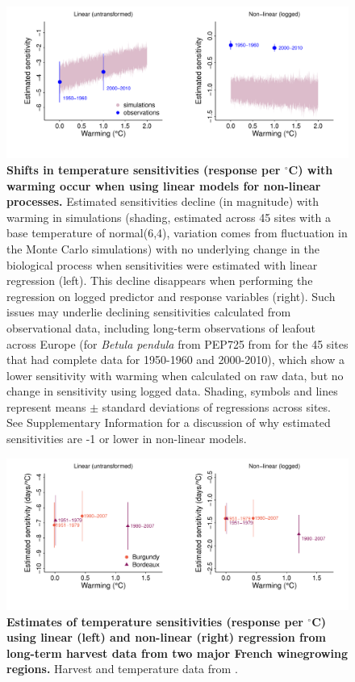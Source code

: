 \documentclass[11pt,letter]{article}
\begin{document}
\begin{figure}[h!]
\centering
\noindent \includegraphics[width=1.05\textwidth]{..//analyses/figures/basicsimsandpepalt1.pdf} %
\caption{\textbf{Shifts in temperature sensitivities (response per $^{\circ}$C)  with warming occur when using linear models for non-linear processes.} Estimated sensitivities decline (in magnitude) with warming in simulations (shading, estimated across 45 sites with a base temperature of normal(6,4), variation comes from fluctuation in the Monte Carlo simulations) with no underlying change in the biological process when sensitivities were estimated with linear regression (left). This decline disappears when performing the regression on logged predictor and response variables (right). Such issues may underlie declining sensitivities calculated from observational data, including long-term observations of leafout across Europe (for \emph{Betula pendula} from PEP725 from for the 45 sites that had complete data for 1950-1960 and 2000-2010), which show a lower sensitivity with warming when calculated on raw data, but no change in sensitivity using logged data. Shading, symbols and lines represent means $\pm$ standard deviations of regressions across sites. See Supplementary Information for a discussion of why estimated sensitivities are -1 or lower in non-linear models.} %
\label{fig:basicsimswpep} %
\end{figure}

\begin{figure}[h!]
\centering
\noindent \includegraphics[width=1\textwidth]{..//analyses/figures/winedata.pdf}
\caption{\textbf{Estimates of temperature sensitivities (response per $^{\circ}$C) using linear (left) and non-linear (right) regression from long-term harvest data from two major French winegrowing regions.} Harvest and temperature data from \citet{cookwine2016}.} 
\label{fig:wine} %
\end{figure}
\end{document}

